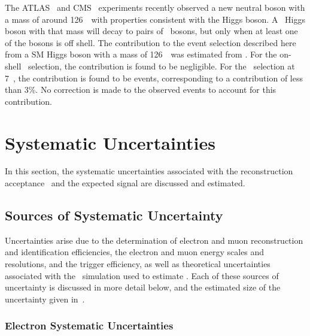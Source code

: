 The ATLAS~\cite{ATLAS_Higgs:2012gk} and CMS~\cite{CMS_Higgs:2012gu} experiments
recently observed a new neutral boson with a mass of around 126~\gev\ with
properties consistent with the Higgs boson. A \sm\ Higgs boson with that mass will
decay to pairs of \Z\ bosons, but only when at least one of the bosons is off
shell. The contribution to the event selection described here from a SM Higgs
boson with a mass of 126~\gev\ was estimated from \mc. For the on-shell \ZZ\
selection, the contribution is found to be negligible. For the \ZZs\ selection
at 7~\tev, the contribution is found to be \measStat{1.7}{\errSym{0.03}} events,
corresponding to a contribution of less than 3\%. No correction is made to the
observed events to account for this contribution.

\section{Systematic Uncertainties}

In this section, the systematic uncertainties associated with the reconstruction
acceptance \CZZ\ and the expected signal are discussed and estimated. %

\subsection{Sources of Systematic Uncertainty}

Uncertainties arise due to the determination of
electron and muon reconstruction and identification efficiencies, the electron
and muon energy scales and resolutions, and the trigger efficiency, as well as
theoretical uncertainties associated with the \mc\ simulation used to estimate
\CZZ. Each of these sources of uncertainty is discussed in more detail below,
and the estimated size of the uncertainty given
in~.

\subsubsection{Electron Systematic Uncertainties}

